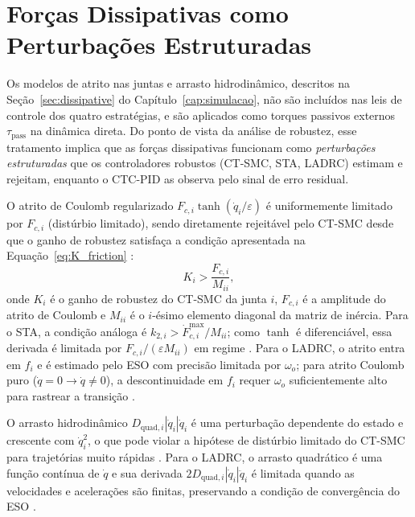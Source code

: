 \section{Forças Dissipativas como Perturbações Estruturadas}
\label{sec:dissipative_cap5}

Os modelos de atrito nas juntas e arrasto hidrodinâmico, descritos na Seção~\ref{sec:dissipative} do Capítulo~\ref{cap:simulacao}, não são incluídos nas leis de controle dos quatro estratégias, e são aplicados como torques passivos externos $\tau_{\text{pass}}$ na dinâmica direta. Do ponto de vista da análise de robustez, esse tratamento implica que as forças dissipativas funcionam como \textit{perturbações estruturadas} que os controladores robustos (CT-SMC, STA, LADRC) estimam e rejeitam, enquanto o CTC-PID as observa pelo sinal de erro residual.

O atrito de Coulomb regularizado $F_{c,i}\tanh(\dot{q}_i/\varepsilon)$ é uniformemente limitado por $F_{c,i}$ (distúrbio limitado), sendo diretamente rejeitável pelo CT-SMC desde que o ganho de robustez satisfaça a condição apresentada na Equação~\eqref{eq:K_friction} \cite{slotine1991applied}:
\begin{equation}
    K_i > \frac{F_{c,i}}{M_{ii}},
    \label{eq:K_friction}
\end{equation}
onde $K_i$ é o ganho de robustez do CT-SMC da junta $i$, $F_{c,i}$ é a amplitude do atrito de Coulomb e $M_{ii}$ é o $i$-ésimo elemento diagonal da matriz de inércia. Para o STA, a condição análoga é $k_{2,i} > \dot{F}_{c,i}^{\max}/M_{ii}$; como $\tanh$ é diferenciável, essa derivada é limitada por $F_{c,i}/(\varepsilon M_{ii})$ em regime \cite{moreno2012strict}. Para o LADRC, o atrito entra em $f_i$ e é estimado pelo ESO com precisão limitada por $\omega_o$; para atrito Coulomb puro ($\dot{q} = 0 \to \dot{q} \neq 0$), a descontinuidade em $f_i$ requer $\omega_o$ suficientemente alto para rastrear a transição \cite{han2009pid, huang2014active}.

O arrasto hidrodinâmico $D_{\text{quad},i}|\dot{q}_i|\dot{q}_i$ é uma perturbação dependente do estado e crescente com $\dot{q}_i^2$, o que pode violar a hipótese de distúrbio limitado do CT-SMC para trajetórias muito rápidas \cite{fossen2011handbook}. Para o LADRC, o arrasto quadrático é uma função contínua de $\dot{q}$ e sua derivada $2D_{\text{quad},i}|\dot{q}_i|\ddot{q}_i$ é limitada quando as velocidades e acelerações são finitas, preservando a condição de convergência do ESO \cite{zheng2010practical}.

